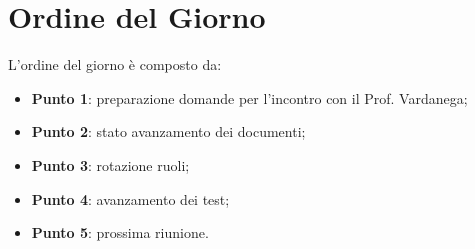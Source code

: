 \section{Ordine del Giorno}
L'ordine del giorno è composto da: 
\begin{itemize}
	\item \textbf{Punto 1}: preparazione domande per l'incontro con il Prof. Vardanega;
	\item \textbf{Punto 2}: stato avanzamento dei documenti;
	\item \textbf{Punto 3}: rotazione ruoli; 
	\item \textbf{Punto 4}: avanzamento dei test;
	\item \textbf{Punto 5}: prossima riunione.
\end{itemize}